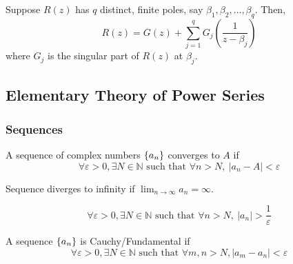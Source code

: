 Suppose $R(z)$ has $q$ distinct, finite poles, say $\beta_1, \beta_2,\dots,\beta_q$.
Then,
\begin{equation}
	R(z) = G(z) + \sum_{j=1}^q G_j\left(\frac{1}{z-\beta_j}\right)
\end{equation}
where $G_j$ is the singular part of $R(z)$ at $\beta_j$.

\subsection{Elementary Theory of Power Series}
\subsubsection{Sequences}
\begin{definition}
	A sequence of complex numbers $\left\{a_n\right\}$ converges to $A$ if \begin{equation}
		\forall\varepsilon > 0, \exists N \in \mathbb{N} \text{ such that }\forall n > N,\ |a_n - A| < \varepsilon
	\end{equation}
\end{definition}

\begin{remark}
	Sequence diverges to infinity if $\displaystyle \lim_{n \to \infty} a_n = \infty$.
\end{remark}
\begin{equation}
	\forall \varepsilon > 0, \exists N \in \mathbb{N} \text{ such that } \forall n > N, \ |a_n| > \frac{1}{\varepsilon}
\end{equation}

\begin{definition}[Cauchy]
	A sequence $\left\{a_n\right\}$ is Cauchy/Fundamental if \begin{equation}
		\forall \varepsilon > 0, \exists N \in \mathbb{N} \text{ such that } \forall m,n > N, |a_m-a_n| < \varepsilon
\end{equation}
\end{definition}

